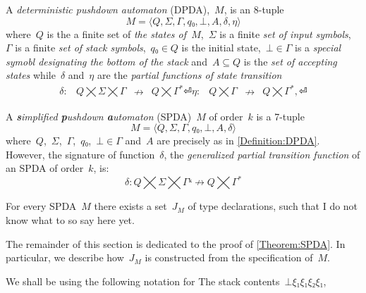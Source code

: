 \begin{Definition}
  \label{Definition:DPDA}
  A \emph{deterministic pushdown automaton} (DPDA),~$M$, is an 8-tuple
  \[
    M =⟨Q,Σ,Γ, q₀,⊥, A,δ,η⟩
  \]
  where~$Q$ is the a finite set of
  \emph{the states of~$M$},~$Σ$ is a finite
  \emph{set of input symbols},~$Γ$ is a finite
  \emph{set of stack symbols},~$q₀∈Q$ is the initial state,~$⊥∈Γ$
  is a \emph{special symobl designating the bottom of the stack}
  and~$A⊆Q$ is the \emph{set of accepting states} while~$δ$ and~$η$ are
  the \emph{partial functions of state transition}
  \[
    \begin{array}{crlc}
      δ: & Q⨉Σ⨉Γ &↛& Q⨉Γ^*⏎
      η: & Q⨉Γ &↛& Q⨉Γ^*,⏎
    \end{array}
  \]
\end{Definition}

\begin{Definition}
  \label{Definition:SPDA}
  A \emph{\textbf simplified \textbf pushdown \textbf automaton} (SPDA)~$M$ of order~$k$ is a 7-tuple
  \[
    M =⟨Q,Σ,Γ,q₀,⊥, A,δ⟩
  \]
  where~$Q$,~$Σ$,~$Γ$,~$q₀$,~$⊥∈Γ$ and~$A$ are precisely as in \cref{Definition:DPDA}.
  However, the signature of function~$δ$, the \emph{generalized partial transition function}
  of an SPDA of order~$k$, is:
  \begin{equation}
    \label{Equation:generalized:transition}
      δ: Q⨉Σ⨉Γᵏ↛Q⨉Γ^*
    \end{equation}
\end{Definition}

\begin{Theorem}
  \label{Theorem:SPDA}
  For every SPDA~$M$ there exists a set~$J_M$ of \Java type declarations, such that
    I do not know what to so say here yet.
\end{Theorem}

\begin{figure}[b]
  \begin{adjustbox}{max width=0.6\linewidth}
    
  \end{adjustbox}
\end{figure}

The remainder of this section is dedicated to the proof of \cref{Theorem:SPDA}.
In particular, we describe how~$J_M$ is constructed from the
  specification of~$M$.

We shall be using the following notation for
The stack contents~$⊥ξ₁ξ₁ξ₂ξ₁$,

